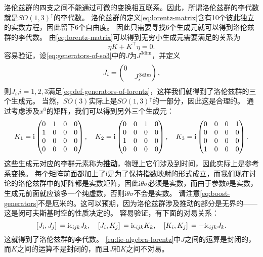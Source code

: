 \documentclass[hyperref, UTF8, a4paper]{ctexart}
\newcommand*{\ii}{\mathrm{i}}
\newcommand{\concept}[1]{\underline{\textbf{#1}}}
\begin{document}
洛伦兹群的四支之间不能通过可微的变换相互联系。因此，所谓洛伦兹群的李代数就是$SO(1,3)^\uparrow$的李代数。
洛伦兹群的定义\eqref{eq:lorentz-matrix}含有10个彼此独立的实数方程，因此留下6个自由度。
因此只需要寻找6个生成元就可以得到洛伦兹群的李代数。
由\eqref{eq:lorentz-matrix}可以得到无穷小生成元需要满足的关系为
\begin{equation}
    \eta K + K^\top \eta = 0.
    \label{eq:def-generators-of-lorentz}
\end{equation}
容易验证，设\eqref{eq:generators-of-so3}中的$J$为$J^\text{3dim}$，并定义
\begin{equation}
    J_i = \pmqty{\dmat{0 ,J^\text{3dim}_i}},
\end{equation}
则$J_i$,$i=1, 2, 3$满足\eqref{eq:def-generators-of-lorentz}，这样我们就得到了洛伦兹群的三个生成元。
当然，$SO(3)$实际上是$SO(1,3)^\uparrow$的一部分，因此这是合理的。
通过考虑涉及$x^0$的矩阵，我们可以得到另外三个生成元：
\begin{equation}
    K_1 = \ii \pmqty{0 & 1 & 0 & 0 \\ 1 & 0 & 0 & 0 \\ 0 & 0 & 0 & 0 \\ 0 & 0 & 0 & 0}, \quad 
    K_2 = \ii \pmqty{0 & 0 & 1 & 0 \\ 0 & 0 & 0 & 0 \\ 1 & 0 & 0 & 0 \\ 0 & 0 & 0 & 0}, \quad
    K_3 = \ii \pmqty{0 & 0 & 0 & 1 \\ 0 & 0 & 0 & 0 \\ 0 & 0 & 0 & 0 \\ 1 & 0 & 0 & 0}.
    \label{eq:boost-generators}
\end{equation}
这些生成元对应的李群元素称为\concept{推动}，物理上它们涉及到时间，因此实际上是参考系变换。
每个矩阵前面都加上了$\ii$是为了保持指数映射的形式成立，而我们现在讨论的洛伦兹群中的矩阵都是实数矩阵，因此$\ii \theta \sigma$必须是实数，而由于参数$\theta$是实数，生成元前面就应该多一个纯虚数，否则$\ii \theta \sigma$不会是实数。
请注意\eqref{eq:boost-generators}不是厄米的。这可以预期，因为洛伦兹群涉及推动的部分是无界的——这是闵可夫斯基时空的性质决定的。
容易验证，有下面的对易关系：
\begin{equation}
    \comm*{J_i}{J_j} = \ii \epsilon_{ijk} J_k, \quad \comm*{J_i}{K_j} = \ii \epsilon_{ijk} K_k, \quad \comm*{K_i}{K_j} = - \ii \epsilon_{ijk} J_k.
    \label{eq:lie-algebra-lorentz}
\end{equation}
这就得到了洛伦兹群的李代数。
\eqref{eq:lie-algebra-lorentz}中$J$之间的运算是封闭的，而$K$之间的运算不是封闭的，而且$J$和$K$之间不对易。
\end{document}

